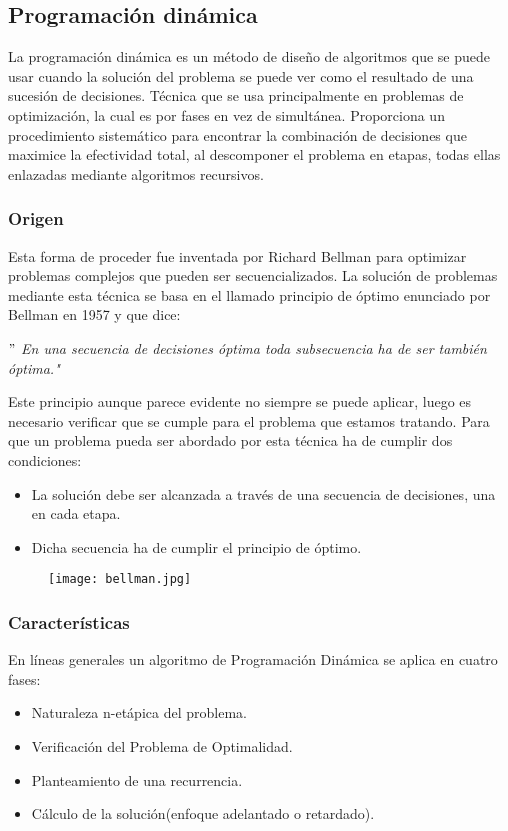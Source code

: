 \subsection{Programación dinámica}
La programación dinámica es un método de diseño de algoritmos que se puede usar cuando la solución del 
problema se puede ver como el resultado de una sucesión de decisiones. Técnica que se usa principalmente en
problemas de optimización, la cual es por fases en vez de simultánea.
Proporciona un procedimiento sistemático para encontrar la combinación de decisiones que maximice la efectividad
total, al descomponer el problema en etapas, todas ellas enlazadas mediante algoritmos recursivos.



\subsubsection{Origen}
Esta forma de proceder fue inventada por Richard Bellman para optimizar problemas complejos que pueden ser 
secuencializados. La solución de problemas mediante esta técnica se basa en el llamado principio de óptimo enunciado por 
Bellman en 1957 y que dice:
\begin{center}
    \emph{ $"$ En una secuencia de decisiones óptima toda subsecuencia ha de ser también óptima."}
\end{center}

Este principio aunque parece evidente no siempre se puede aplicar, luego es necesario verificar que se cumple para el problema
que estamos tratando. Para que un problema pueda ser abordado por esta técnica ha de cumplir dos condiciones:
\begin{itemize}
    \item La solución debe ser alcanzada a través de una secuencia de decisiones, una en cada etapa.
    \item Dicha secuencia ha de cumplir el principio de óptimo.
\end{itemize}

\begin{figure}[h]
    \raggedleft
    \texttt{[image: bellman.jpg]}
\end{figure}

\subsubsection{Características}
En líneas generales un algoritmo de Programación Dinámica se aplica en cuatro fases:
\begin{itemize}
    \item Naturaleza n-etápica del problema.
    \item Verificación del Problema de Optimalidad.
    \item Planteamiento de una recurrencia.
    \item Cálculo de la solución(enfoque adelantado o retardado). 
\end{itemize}

